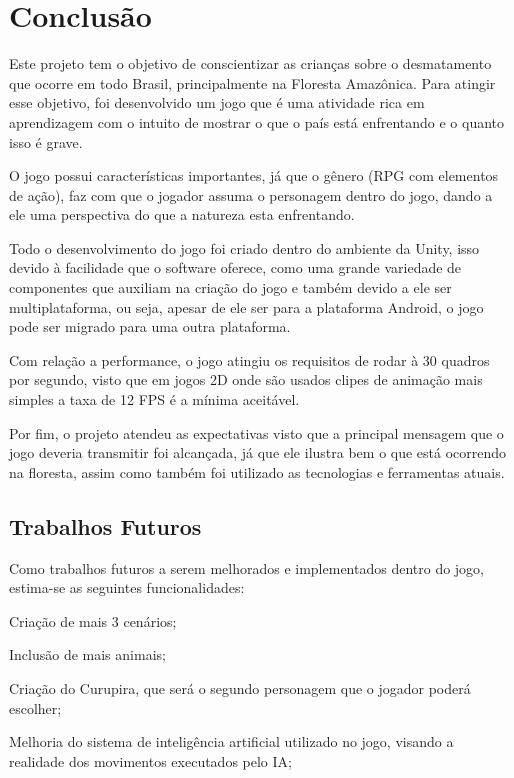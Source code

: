 \chapter{Conclusão}
\label{chap:conclusoes-e-trabalhos-futuros}

Este projeto tem o objetivo de conscientizar as crianças sobre o desmatamento que ocorre em todo Brasil, principalmente na Floresta Amazônica. Para atingir esse objetivo, foi desenvolvido um jogo que é uma atividade rica em aprendizagem com o intuito de mostrar o que o país está enfrentando e o quanto isso é grave.

O jogo possui características importantes, já que o gênero (RPG com elementos de ação), faz com que o jogador assuma o personagem dentro do jogo, dando a ele uma perspectiva do que a natureza esta enfrentando.

Todo o desenvolvimento do jogo foi criado dentro do ambiente da Unity, isso devido à facilidade que o software oferece, como uma grande variedade de componentes que auxiliam na criação do jogo e também devido a ele ser multiplataforma, ou seja, apesar de ele ser para a plataforma Android, o jogo pode ser migrado para uma outra plataforma.

Com relação a performance, o jogo atingiu os requisitos de rodar à 30 quadros por segundo, visto que em jogos 2D onde são usados clipes de animação mais simples a taxa de 12 FPS é a mínima aceitável. 

Por fim, o projeto atendeu as expectativas visto que a principal mensagem que o jogo deveria transmitir foi alcançada, já que ele ilustra bem o que está ocorrendo na floresta, assim como também foi utilizado as tecnologias e ferramentas atuais.

\section{Trabalhos Futuros}
\label{sec:trabalhos-futuros}

Como trabalhos futuros a serem melhorados e implementados dentro do jogo, estima-se as seguintes funcionalidades:

\begin{alineascomponto}
	
   \item Criação de mais 3 cenários;
   \item Inclusão de mais animais;
   \item Criação do Curupira, que será o segundo personagem que o jogador poderá escolher;
   \item Melhoria do sistema de inteligência artificial utilizado no jogo, visando a realidade dos movimentos executados pelo IA;

	\end{alineascomponto}